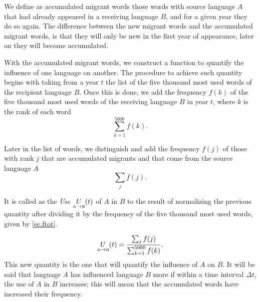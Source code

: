 \documentclass[10pt,letterpaper]{article} %
\begin{document}
	We define as accumulated migrant words those words with source language $A$
	that had already appeared in a receiving language $B$, and for a given year
	they do so again. The difference between the new migrant words and the
	accumulated migrant words, is that they will only be new in the first year of
	appearance, later on they will become accumulated.
	
	With the accumulated migrant words, we construct a function to quantify the
	influence of one language on 
	another. The procedure to
	achieve such quantity begins with taking from a year $t$ the list of the five
	thousand most used words of the recipient language $B$. Once this is done, we
	add the frequency $f(k)$ of the five thousand most used words of the receiving
	language $B$ in year $t$, where $k$ is the rank of each word
	\begin{equation}
	\label{ec.ftot}
	\sum_{k=1}^{5000} f(k).
	\end{equation}
	
	Later in the list of words, we distinguish and add the frequency $f(j)$  of
	those with rank $j$ that are accumulated migrants and that come from the source
	language $A$ 
	\begin{equation}
	\label{ec.fpres}
	\sum_{j} f(j).
	\end{equation}
	
	It is called as the \textit{Use} $\underset{ \text{\tiny A} \to \text{\tiny B} }{U}(t)$ of $A$ in $B$ to the result of normalizing the previous quantity after dividing it by the frequency of the five thousand most used words, given by \ref{ec.ftot}.
	
	\begin{equation}
	\label{ec.fuso1}
	\underset{ \text{\tiny A} \to  \text{\tiny B} }{U}(t) = \frac{\sum_{j} f(j)}{\sum_{k=1}^{5000} f(k)}.
	\end{equation}
	This new quantity is the one that will quantify the influence of $A$ on $B$. It will be said that language $A$ has influenced language $B$ more if within a time interval $\Delta t$, the use of $A$ in $B$ increases; this will mean that the accumulated words have increased their frequency.
	
\end{document}
